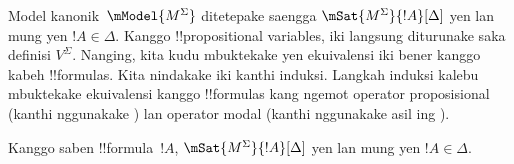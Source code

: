 \documentclass[../../../include/open-logic-section]{subfiles}
\begin{document}


Model kanonik~$\mModel{M^\Sigma}$ ditetepake saengga
$\mSat{M^\Sigma}{!A}[\Delta]$ yen lan mung yen $!A \in \Delta$.
Kanggo !!{propositional
variable}s, iki langsung diturunake saka
definisi $V^\Sigma$. Nanging, kita kudu mbuktekake yen ekuivalensi
iki bener kanggo kabeh !!{formula}s. Kita nindakake iki kanthi induksi.
Langkah induksi kalebu mbuktekake ekuivalensi kanggo !!{formula}s kang
ngemot operator proposisional (kanthi nggunakake
) lan operator modal (kanthi nggunakake
asil ing ).

\begin{prop}
  Kanggo saben !!{formula}~$!A$, $\mSat{M^\Sigma}{!A}[\Delta]$ yen lan
  mung yen $!A \in \Delta$.
\end{prop}
\end{document}
